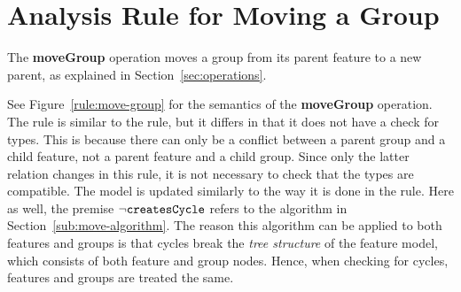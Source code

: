 \section{Analysis Rule for Moving a Group}
\label{sec:move-group-rule}
The \textbf{moveGroup} operation moves a group from its parent feature to a new parent, as explained in Section~\ref{sec:operations}.

See Figure~\ref{rule:move-group} for the semantics of the \textbf{moveGroup} operation. The rule is similar to the  rule, but it differs in that it does not have a check for types. This is because there can only be a conflict between a parent group and a child feature, not a parent feature and a child group. Since only the latter relation changes in this rule, it is not necessary to check that the types are compatible. The model is updated similarly to the way it is done in the  rule. Here as well, the premise $\neg \texttt{createsCycle}$ refers to the algorithm in Section~\ref{sub:move-algorithm}. The reason this algorithm can be applied to both features and groups is that cycles break the \emph{tree structure} of the feature model, which consists of both feature and group nodes. Hence, when checking for cycles, features and groups are treated the same.

